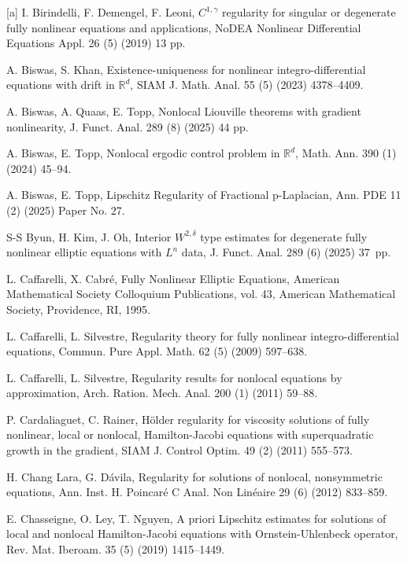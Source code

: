 \documentclass[11pt,reqno]{amsart}
\numberwithin{equation}{section}
\begin{document}
\begin{thebibliography}{[a]}
 I. Birindelli, F. Demengel, F. Leoni, $C^{1,\gamma}$ regularity for singular or degenerate fully nonlinear equations and applications, NoDEA Nonlinear Differential Equations Appl. 26 (5) (2019) 13 pp.

 A. Biswas, S. Khan, Existence-uniqueness for nonlinear integro-differential equations with drift in $\mathbb{R}^d$, SIAM J. Math. Anal. 55 (5) (2023) 4378--4409.

 A. Biswas, A. Quaas, E. Topp, Nonlocal Liouville theorems with gradient nonlinearity, J. Funct. Anal. 289 (8) (2025) 44 pp.

 A. Biswas, E. Topp, Nonlocal ergodic control problem in $\mathbb{R}^d$, Math. Ann. 390 (1) (2024) 45--94.

 A. Biswas, E. Topp, Lipschitz Regularity of Fractional p-Laplacian, Ann. PDE 11 (2) (2025) Paper No. 27.

 S-S Byun, H. Kim, J. Oh, Interior $W^{2,\delta}$ type estimates for degenerate fully nonlinear elliptic equations with $L^n$ data, J. Funct. Anal. 289 (6) (2025) 37~pp.

 L. Caffarelli, X. Cabr\'{e}, Fully Nonlinear Elliptic Equations, American Mathematical Society Colloquium Publications, vol. 43, American Mathematical Society, Providence, RI, 1995.

 L. Caffarelli, L. Silvestre, Regularity theory for fully nonlinear integro-differential equations, Commun. Pure Appl.
Math. 62 (5) (2009) 597--638.

 L. Caffarelli, L. Silvestre, Regularity results for nonlocal equations by approximation, Arch. Ration. Mech. Anal.
200 (1) (2011) 59--88.

 P. Cardaliaguet, C. Rainer, H\"{o}lder regularity for viscosity solutions of fully nonlinear, local or nonlocal, Hamilton-Jacobi equations with superquadratic growth in the gradient, SIAM J. Control Optim. 49 (2) (2011) 555--573.

 H. Chang Lara, G. D\'{a}vila, Regularity for solutions of nonlocal, nonsymmetric equations, Ann. Inst. H. Poincar\'{e} C Anal. Non Lin\'{e}aire 29 (6) (2012) 833--859.

 E. Chasseigne, O. Ley, T. Nguyen, A priori Lipschitz estimates for solutions of local and nonlocal Hamilton-Jacobi equations with Ornstein-Uhlenbeck operator, Rev. Mat. Iberoam. 35 (5) (2019) 1415--1449.


\end{thebibliography}
\end{document}
